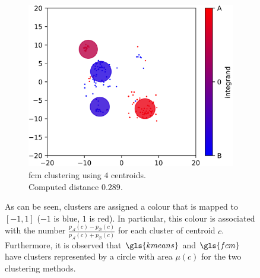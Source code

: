 \begin{modified}
\begin{figure}[p]
\begin{subfigure}{0.48\linewidth}
		\label{fig:kmeans_clustering}
	\end{subfigure}
	\begin{subfigure}{\linewidth}
		\includegraphics[width=\linewidth]{Figures/fcm_comparison.png}
		\caption[\gls{fcm} clustering, example of comparison]{\gls{fcm} clustering using $4$ centroids.\\ Computed distance $0.289$.}
		\label{fig:fcm_clustering}
	\end{subfigure}
	\caption[Comparing $3$ clustering techniques]{As can be seen, clusters are assigned a colour that is mapped to $[-1,1]$ ($-1$ is blue, $1$ is red). In particular, this colour is associated with the number $\frac{p_\mathcal{A}(c)-p_\mathcal{B}(c)}{p_\mathcal{A}(c)+p_\mathcal{B}(c)}$ for each cluster of centroid $c$. Furthermore, it is observed that $\gls{kmeans}$ and $\gls{fcm}$ have clusters represented by a circle with area $\mu(c)$ for the two clustering methods.}
\end{figure}
\end{modified}

